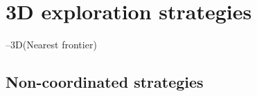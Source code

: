 \section{3D exploration strategies}
--3D(Nearest frontier)



\subsection{Non-coordinated strategies}